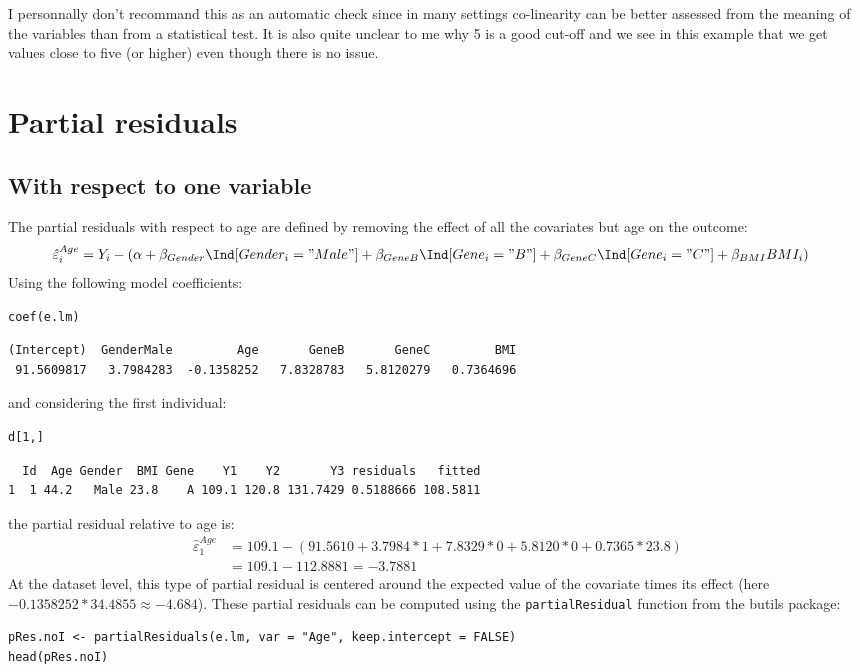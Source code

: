 \documentclass[12pt]{article}
\begin{document}
I personnally don't recommand this as an automatic check since in many
  settings co-linearity can be better assessed from the meaning of the
  variables than from a statistical test. It is also quite unclear to
  me why 5 is a good cut-off and we see in this example that we get
  values close to five (or higher) even though there is no issue.

\clearpage


\section{Partial residuals}
\label{sec:pRes}
\subsection{With respect to one variable}
\label{sec:orgac77490}

The partial residuals with respect to age are defined by removing the
effect of all the covariates but age on the outcome:
\begin{align*}
\hat{\varepsilon}^{Age}_i &= Y_i - \left(\alpha + \beta_{Gender} \Ind[Gender_i="Male"] + \beta_{GeneB} \Ind[Gene_i="B"] + \beta_{GeneC} \Ind[Gene_i="C"]  + \beta_{BMI} BMI_i\right)
\end{align*}
Using the following model coefficients:
\lstset{language=r,label= ,caption= ,captionpos=b,numbers=none}
\begin{lstlisting}
coef(e.lm)
\end{lstlisting}

\begin{verbatim}
(Intercept)  GenderMale         Age       GeneB       GeneC         BMI 
 91.5609817   3.7984283  -0.1358252   7.8328783   5.8120279   0.7364696
\end{verbatim}

and considering the first individual:
\lstset{language=r,label= ,caption= ,captionpos=b,numbers=none}
\begin{lstlisting}
d[1,]
\end{lstlisting}

\begin{verbatim}
  Id  Age Gender  BMI Gene    Y1    Y2       Y3 residuals   fitted
1  1 44.2   Male 23.8    A 109.1 120.8 131.7429 0.5188666 108.5811
\end{verbatim}

the partial residual relative to age is:
\begin{align*}
\hat{\varepsilon}^{Age}_1 &= 109.1 - \left(91.5610 + 3.7984 * 1 + 7.8329 * 0 + 5.8120 * 0 + 0.7365 * 23.8 \right) \\
                         &= 109.1 - 112.8881 = -3.7881
\end{align*}
At the dataset level, this type of partial residual is centered around
the expected value of the covariate times its effect (here
\(-0.1358252*34.4855 \approx -4.684\)). These partial residuals can be
computed using the \texttt{partialResidual} function from the butils package:
\lstset{language=r,label= ,caption= ,captionpos=b,numbers=none}
\begin{lstlisting}
pRes.noI <- partialResiduals(e.lm, var = "Age", keep.intercept = FALSE)
head(pRes.noI)
\end{lstlisting}
\end{document}
